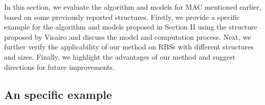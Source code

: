 \documentclass{article}
\begin{document}


In this section, we evaluate the algorithm and models for MAC mentioned earlier, based on some previously reported structures. 
Firstly, we provide a specific example for the algorithm and models proposed in Section II using the structure proposed by Visairo and discuss the model and computation process.
Next, we further verify the applicability of our method on RBSs with different structures and sizes. 
Finally, we highlight the advantages of our method and suggest directions for future improvements.


\subsection{An specific example}
\end{document}
